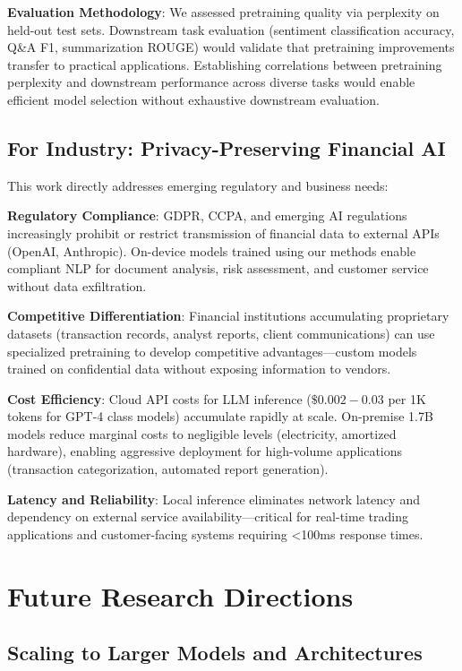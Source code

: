 \textbf{Evaluation Methodology}: We assessed pretraining quality via perplexity on held-out test sets. Downstream task evaluation (sentiment classification accuracy, Q\&A F1, summarization ROUGE) would validate that pretraining improvements transfer to practical applications. Establishing correlations between pretraining perplexity and downstream performance across diverse tasks would enable efficient model selection without exhaustive downstream evaluation.

\subsection{For Industry: Privacy-Preserving Financial AI}

This work directly addresses emerging regulatory and business needs:

\textbf{Regulatory Compliance}: GDPR, CCPA, and emerging AI regulations increasingly prohibit or restrict transmission of financial data to external APIs (OpenAI, Anthropic). On-device models trained using our methods enable compliant NLP for document analysis, risk assessment, and customer service without data exfiltration.

\textbf{Competitive Differentiation}: Financial institutions accumulating proprietary datasets (transaction records, analyst reports, client communications) can use specialized pretraining to develop competitive advantages—custom models trained on confidential data without exposing information to vendors.

\textbf{Cost Efficiency}: Cloud API costs for LLM inference ($\$0.002-0.03$ per 1K tokens for GPT-4 class models) accumulate rapidly at scale. On-premise 1.7B models reduce marginal costs to negligible levels (electricity, amortized hardware), enabling aggressive deployment for high-volume applications (transaction categorization, automated report generation).

\textbf{Latency and Reliability}: Local inference eliminates network latency and dependency on external service availability—critical for real-time trading applications and customer-facing systems requiring <100ms response times.

\section{Future Research Directions}

\subsection{Scaling to Larger Models and Architectures}


